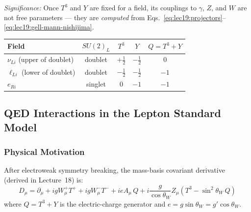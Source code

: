 \textit{Significance:} Once $T^3$ and $Y$ are fixed for a field, its
couplings to $\gamma$, $Z$, and $W$ are not free parameters --- they are
\emph{computed} from Eqs.~\eqref{eq:lec19:projectors}--\eqref{eq:lec19:gell-mann-nishijima}.

\begin{center}
\renewcommand{\arraystretch}{1.3}
\begin{tabular}{@{}lcccc@{}}
  \toprule
  Field & $SU(2)_L$ & $T^3$ & $Y$ & $Q=T^3+Y$\\
  \midrule
  $\nu_{Li}$ (upper of doublet) & doublet & $+\tfrac12$ & $-\tfrac12$ & $0$\\
  $\ell_{Li}$ (lower of doublet) & doublet & $-\tfrac12$ & $-\tfrac12$ & $-1$\\
  $e_{Ri}$ & singlet & $0$ & $-1$ & $-1$\\
  \bottomrule
\end{tabular}
\end{center}


\subsection{QED Interactions in the Lepton Standard Model}\label{subsec:lec19:qed}

\subsubsection*{Physical Motivation}

After electroweak symmetry breaking, the mass-basis covariant derivative
(derived in Lecture~18) is:
\begin{equation}
  D_\mu = \partial_\mu
          + ig W^+_\mu T^+
          + ig W^-_\mu T^-
          + ie A_\mu\, Q
          + i\frac{g}{\cos\theta_W} Z_\mu\!\left(T^3 - \sin^2\!\theta_W\, Q\right)
  \label{eq:lec19:cov-deriv}
\end{equation}
where $Q = T^3 + Y$ is the electric-charge generator and
$e = g\sin\theta_W = g'\cos\theta_W$.

